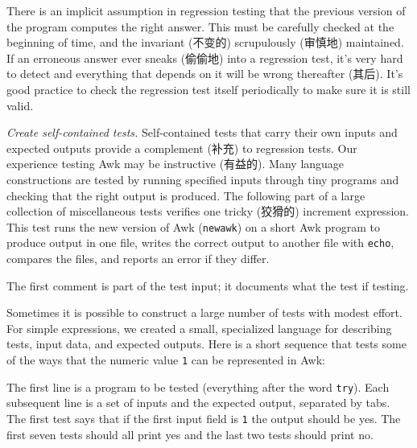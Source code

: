 There is an implicit assumption in regression testing that the previous
version of the program computes the right answer. This must be carefully
checked at the beginning of time, and the invariant (不变的) scrupulously
(审慎地) maintained. If an erroneous answer ever sneaks (偷偷地) into a
regression test, it's very hard to detect and everything that depends on it
will be wrong thereafter (其后). It's good practice to check the regression
test itself periodically to make sure it is still valid.

\emph{Create self-contained tests.} Self-contained tests that carry their
own inputs and expected outputs provide a complement (补充) to regression
tests. Our experience testing Awk may be instructive (有益的). Many
language constructions are tested by running specified inputs through tiny
programs and checking that the right output is produced. The following part
of a large collection of miscellaneous tests verifies one tricky (狡猾的)
increment expression. This test runs the new version of Awk
(\texttt{newawk}) on a short Awk program to produce output in one file,
writes the correct output to another file with \texttt{echo}, compares the
files, and reports an error if they differ.
The first comment is part of the test input; it documents what the test if
testing.

Sometimes it is possible to construct a large number of tests with modest
effort. For simple expressions, we created a small, specialized language
for describing tests, input data, and expected outputs. Here is a short
sequence that tests some of the ways that the numeric value \texttt{1} can
be represented in Awk:
The first line is a program to be tested (everything after the word
\texttt{try}).  Each subsequent line is a set of inputs and the expected
output, separated by tabs.  The first test says that if the first input
field is \texttt{1} the output should be yes. The first seven tests should
all print yes and the last two tests should print no.

